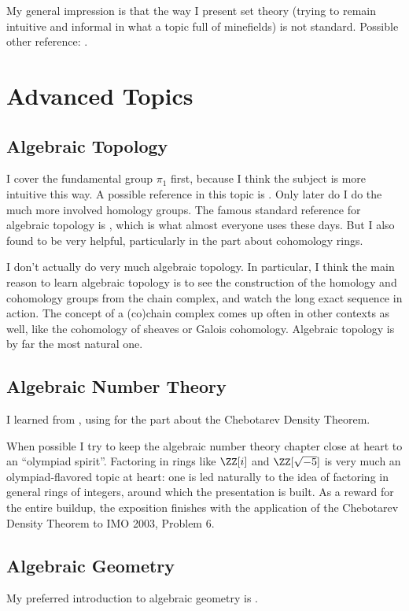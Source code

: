 My general impression is that the way I present set theory
(trying to remain intuitive and informal in what a topic full of minefields)
is not standard. Possible other reference: \cite{ref:miquel}.

\section{Advanced Topics}
\subsection{Algebraic Topology}
I cover the fundamental group $\pi_1$ first, because I think the subject is more
intuitive this way. A possible reference in this topic is \cite{ref:munkres}.
Only later do I do the much more involved homology groups.
The famous standard reference for algebraic topology is \cite{ref:hatcher},
which is what almost everyone uses these days.
But I also found \cite{ref:maxim752} to be very helpful,
particularly in the part about cohomology rings.

I don't actually do very much algebraic topology.
In particular, I think the main reason to learn algebraic topology
is to see the construction of the homology and cohomology groups
from the chain complex, and watch the long exact sequence in action.
The concept of a (co)chain complex comes up often in other contexts as well,
like the cohomology of sheaves or Galois cohomology.
Algebraic topology is by far the most natural one.

\subsection{Algebraic Number Theory}
I learned from \cite{ref:oggier_NT}, using \cite{ref:lenstra_chebotarev}
for the part about the Chebotarev Density Theorem.

When possible I try to keep the algebraic number theory chapter close at
heart to an ``olympiad spirit''.
Factoring in rings like $\ZZ[i]$ and $\ZZ[\sqrt{-5}]$
is very much an olympiad-flavored topic at heart:
one is led naturally to the idea of factoring in general rings of integers,
around which the presentation is built.
As a reward for the entire buildup, the exposition finishes
with the application of the Chebotarev Density Theorem to IMO 2003, Problem 6.

\subsection{Algebraic Geometry}
My preferred introduction to algebraic geometry is \cite{ref:gathmann}.

